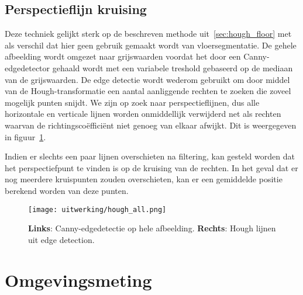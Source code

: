 \subsection{Perspectieflijn kruising}\label{sec:perspectieflijnkruising}
Deze techniek gelijkt sterk op de beschreven methode uit~\ref{sec:hough_floor} met als verschil dat hier geen gebruik gemaakt wordt van vloersegmentatie.
De gehele afbeelding wordt omgezet naar grijswaarden voordat het door een Canny-edgedetector gehaald wordt met een variabele treshold gebaseerd op de mediaan van de grijswaarden.
De edge detectie wordt wederom gebruikt om door middel van de Hough-transformatie een aantal aanliggende rechten te zoeken die zoveel mogelijk punten snijdt.
We zijn op zoek naar perspectieflijnen, dus alle horizontale en verticale lijnen worden onmiddellijk verwijderd net als rechten waarvan de richtingsco\"{e}ffici\"{e}nt
niet genoeg van elkaar afwijkt. Dit is weergegeven in figuur~\ref{fig:hough_all}.

Indien er slechts een paar lijnen overschieten na filtering, kan gesteld worden dat het perspectiefpunt te vinden is op de kruising van de rechten.
In het geval dat er nog meerdere kruispunten zouden overschieten, kan er een gemiddelde positie berekend worden van deze punten.

\begin{figure}
    \texttt{[image: uitwerking/hough\_all.png]}
    \caption{\textbf{Links}: Canny-edgedetectie op hele afbeelding. \textbf{Rechts}: Hough lijnen uit edge detection.}
    \label{fig:hough_all}
\end{figure}


\section{Omgevingsmeting} \label{sec:omgevingsmeting}

